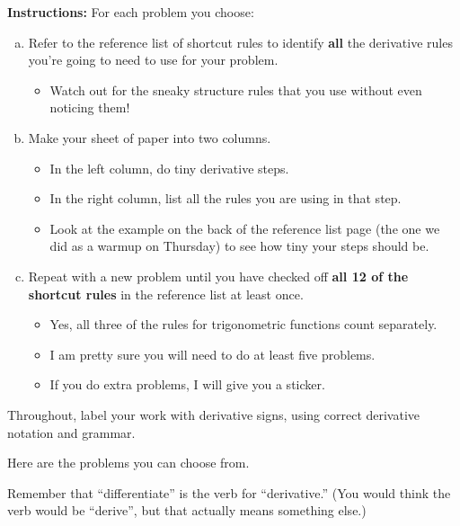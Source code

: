 \textbf{Instructions:}
For each problem you choose:
\begin{enumerate}[(a)]
	\item Refer to the reference list of shortcut rules to identify \textbf{all} the derivative rules you're going to need to use for your problem.
    \begin{itemize}
        \item Watch out for the sneaky structure rules that you use without even noticing them!
    \end{itemize}
    \item Make your sheet of paper into two columns. 
    \begin{itemize}
        \item In the left column, do tiny derivative steps. 
        \item In the right column, list all the rules you are using in that step.
        \item Look at the example on the back of the reference list page (the one we did as a warmup on Thursday) to see how tiny your steps should be.
    \end{itemize}
	\item Repeat with a new problem until you have checked off \textbf{all 12 of the shortcut rules} in the reference list at least once.
    \begin{itemize}
        \item Yes, all three of the rules for trigonometric functions count separately.
        \item I am pretty sure you will need to do at least five problems.
        \item If you do extra problems, I will give you a sticker.
    \end{itemize}
\end{enumerate}
Throughout, label your work with derivative signs, using correct derivative notation and grammar.

\pagebreak

Here are the problems you can choose from. 

Remember that ``differentiate'' is the verb for ``derivative.'' (You would think the verb would be ``derive'', but that actually means something else.)

